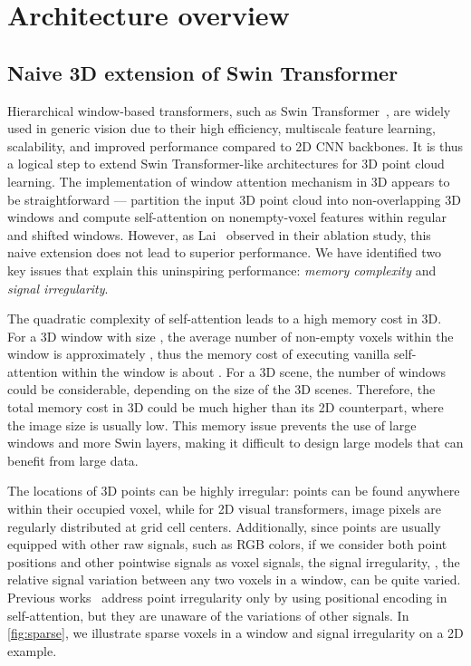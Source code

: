 \documentclass[10pt,twocolumn,letterpaper]{article}
\begin{document}
\section{Architecture overview}

\subsection{Naive 3D extension of Swin Transformer}
Hierarchical window-based transformers, such as Swin Transformer~\cite{liu2021swin}, are widely used in generic vision due to their high efficiency, multiscale feature learning, scalability, and improved performance compared to 2D CNN backbones. It is thus a logical step to extend Swin Transformer-like architectures for 3D point cloud learning. The implementation of window attention mechanism in 3D appears to be straightforward --- partition the input 3D point cloud into non-overlapping 3D windows and compute self-attention on nonempty-voxel features within regular and shifted windows. However, as Lai~\etal {} observed in their ablation study, this naive extension does not lead to superior performance. We have identified two key issues that explain this uninspiring performance: \emph{memory complexity} and \emph{signal irregularity}.

 The quadratic complexity of self-attention leads to a high memory cost in 3D. For a 3D window with size , the average number of non-empty voxels within the window is approximately , thus the memory cost of executing vanilla self-attention within the window is about . For a 3D scene, the number of windows  could be considerable, depending on the size of the 3D scenes. Therefore, the total memory cost  in 3D could be much higher than its 2D counterpart, where the image size is usually low. This memory issue prevents the use of large windows and more Swin layers, making it difficult to design large models that can benefit from large data. 

 The locations of 3D points can be highly irregular: points can be found anywhere within their occupied voxel, while for 2D visual transformers, image pixels are regularly distributed at grid cell centers. Additionally, since points are usually equipped with other raw signals, such as RGB colors, if we consider both point positions and other pointwise signals as voxel signals, the signal irregularity, \ie, the relative signal variation between any two voxels in a window, can be quite varied. Previous works~ address point irregularity only by using positional encoding in self-attention, but they are unaware of the variations of other signals. In \cref{fig:sparse}, we illustrate sparse voxels in a window and signal irregularity on a 2D example.
\end{document}
